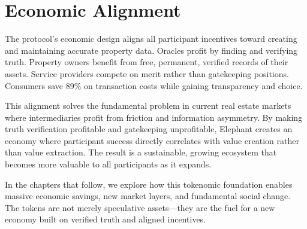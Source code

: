 \section{Economic Alignment}

The protocol's economic design aligns all participant incentives toward creating and maintaining accurate property data. Oracles profit by finding and verifying truth. Property owners benefit from free, permanent, verified records of their assets. Service providers compete on merit rather than gatekeeping positions. Consumers save 89\% on transaction costs while gaining transparency and choice.

This alignment solves the fundamental problem in current real estate markets where intermediaries profit from friction and information asymmetry. By making truth verification profitable and gatekeeping unprofitable, Elephant creates an economy where participant success directly correlates with value creation rather than value extraction. The result is a sustainable, growing ecosystem that becomes more valuable to all participants as it expands.

In the chapters that follow, we explore how this tokenomic foundation enables massive economic savings, new market layers, and fundamental social change. The tokens are not merely speculative assets—they are the fuel for a new economy built on verified truth and aligned incentives.